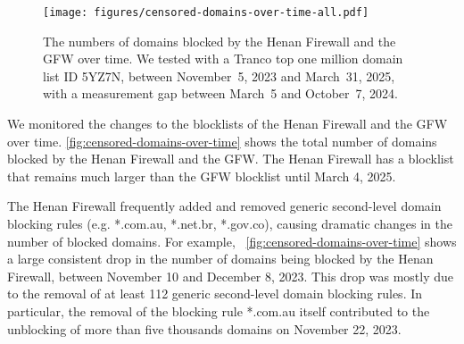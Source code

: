 \documentclass[conference,compsoc]{IEEEtran}
\begin{document}



\begin{figure}[t]
  \centering
  \texttt{[image: figures/censored-domains-over-time-all.pdf]}
  \caption{
    The numbers of domains
    blocked by the Henan Firewall and the GFW over time.
    We tested with a Tranco top one million domain list ID 5YZ7N,
    between November~5, 2023 and March~31, 2025,
    with a measurement gap between March~5 and October~7, 2024.
  }
  \label{fig:censored-domains-over-time}
\end{figure}

We monitored the changes to the blocklists of the Henan Firewall and the GFW over time.
\autoref{fig:censored-domains-over-time} shows
the total number of domains blocked by the Henan Firewall and the GFW.
The Henan Firewall has a blocklist that remains much larger than the GFW blocklist until March 4, 2025.


The Henan Firewall frequently added and removed
generic second-level domain blocking rules (e.g. *.com.au, *.net.br, *.gov.co),
causing dramatic changes in the number of blocked domains.
For example,
~\autoref{fig:censored-domains-over-time} shows
a large consistent drop in the number of domains being blocked by the Henan Firewall,
between November 10 and December 8, 2023.
This drop was mostly due to the removal of at least 112 generic second-level domain blocking rules.
In particular,
the removal of the blocking rule *.com.au itself
contributed to the unblocking of more than five thousands domains on November 22, 2023.
\end{document}
